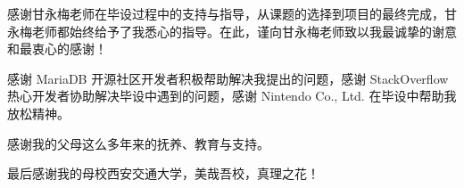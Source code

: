 
感谢甘永梅老师在毕设过程中的支持与指导，从课题的选择到项目的最终完成，甘永梅老师都始终给予了我悉心的指导。在此，谨向甘永梅老师致以我最诚挚的谢意和最衷心的感谢！

感谢 MariaDB 开源社区开发者积极帮助解决我提出的问题，感谢 StackOverflow 热心开发者协助解决毕设中遇到的问题，感谢 Nintendo Co., Ltd. 在毕设中帮助我放松精神。

感谢我的父母这么多年来的抚养、教育与支持。

最后感谢我的母校西安交通大学，美哉吾校，真理之花！
